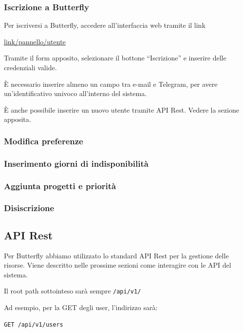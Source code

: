 \subsubsection{Iscrizione a Butterfly}

Per iscriversi a Butterfly, accedere all'interfaccia web tramite il link

\begin{center}
    \url{link/pannello/utente}
\end{center}

Tramite il form apposito, selezionare il bottone ``Iscrizione'' e inserire delle credenziali valide.

È necessario inserire almeno un campo tra e-mail e Telegram, per avere un'identificativo univoco
all'interno del sistema.

È anche possibile inserire un nuovo utente tramite API Rest. Vedere la sezione apposita.


\subsubsection{Modifica preferenze}

\subsubsection{Inserimento giorni di indisponibilità}

\subsubsection{Aggiunta progetti e priorità}

\subsubsection{Disiscrizione}


\subsection{API Rest}\label{APIRest}

Per Butterfly abbiamo utilizzato lo standard API Rest per la gestione delle risorse.
Viene descritto nelle prossime sezioni come interagire con le API del sistema.

Il root path sottointeso sarà sempre \texttt{\UriImola/api/v1/}

Ad esempio, per la GET degli user, l'indirizzo sarà:
\begin{center}
    \texttt{GET \UriImola/api/v1/users}
\end{center}

